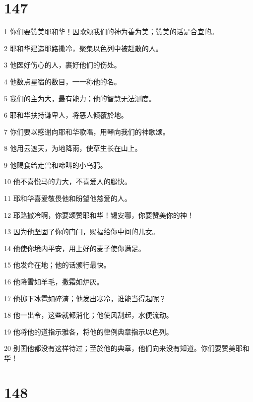 \chapter{147}

\par 1 你们要赞美耶和华！因歌颂我们的神为善为美；赞美的话是合宜的。
\par 2 耶和华建造耶路撒冷，聚集以色列中被赶散的人。
\par 3 他医好伤心的人，裹好他们的伤处。
\par 4 他数点星宿的数目，一一称他的名。
\par 5 我们的主为大，最有能力；他的智慧无法测度。
\par 6 耶和华扶持谦卑人，将恶人倾覆於地。
\par 7 你们要以感谢向耶和华歌唱，用琴向我们的神歌颂。
\par 8 他用云遮天，为地降雨，使草生长在山上。
\par 9 他赐食给走兽和啼叫的小乌鸦。
\par 10 他不喜悦马的力大，不喜爱人的腿快。
\par 11 耶和华喜爱敬畏他和盼望他慈爱的人。
\par 12 耶路撒冷啊，你要颂赞耶和华！锡安哪，你要赞美你的神！
\par 13 因为他坚固了你的门闩，赐福给你中间的儿女。
\par 14 他使你境内平安，用上好的麦子使你满足。
\par 15 他发命在地；他的话颁行最快。
\par 16 他降雪如羊毛，撒霜如炉灰。
\par 17 他掷下冰雹如碎渣；他发出寒冷，谁能当得起呢？
\par 18 他一出令，这些就都消化；他使风刮起，水便流动。
\par 19 他将他的道指示雅各，将他的律例典章指示以色列。
\par 20 别国他都没有这样待过；至於他的典章，他们向来没有知道。你们要赞美耶和华！

\chapter{148}

